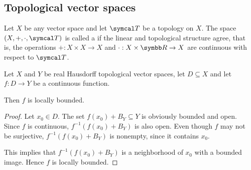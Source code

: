 \subsection{Topological vector spaces}\label{subsec:topological_vector_spaces}

\begin{definition}\label{def:topological_vector_space}
  Let \( X \) be any vector space and let \( \Cal{T} \) be a topology on \( X \). The space \( (X, +, \cdot, \Cal{T}) \) is called a  if the linear and topological structure agree, that is, the operations \( +: X \times X \to X \) and \( \cdot: X \times \R \to X \) are continuous with respect to \( \Cal{T} \).
\end{definition}

\begin{proposition}\label{thm:continuous_implies_locally_bounded}
  Let \( X \) and \( Y \) be real Hausdorff topological vector spaces, let \( D \subseteq X \) and let \( f: D \to Y \) be a continuous function.

  Then \( f \) is locally bounded.
\end{proposition}
\begin{proof}
  Let \( x_0 \in D \). The set \( f(x_0) + B_Y \subseteq Y \) is obviously bounded and open. Since \( f \) is continuous, \( f^{-1}(f(x_0) + B_Y) \) is also open. Even though \( f \) may not be surjective, \( f^{-1}(f(x_0) + B_Y) \) is nonempty, since it contains \( x_0 \).

  This implies that \( f^{-1}(f(x_0) + B_Y) \) is a neighborhood of \( x_0 \) with a bounded image. Hence \( f \) is locally bounded.
\end{proof}
